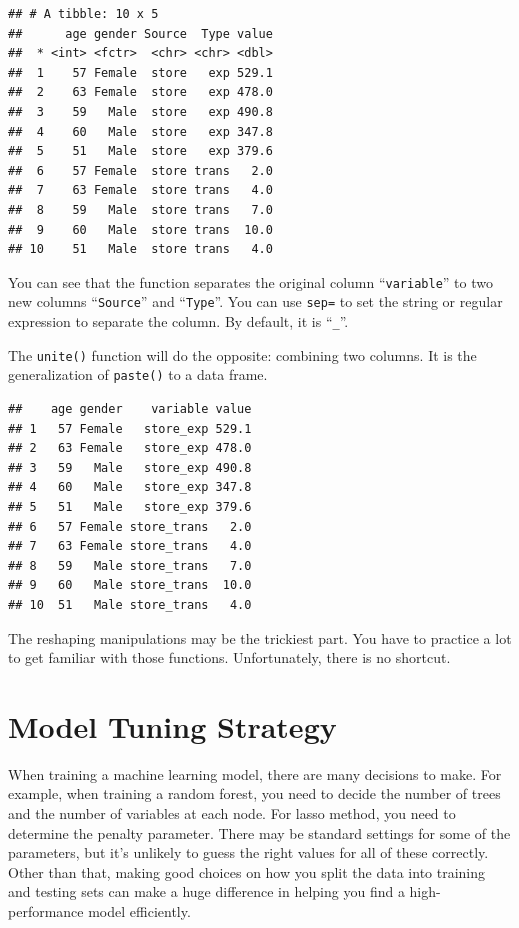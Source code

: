 \documentclass[12pt,]{krantz}
\newenvironment{Shaded}{\begin{snugshade}}{\end{snugshade}}
\newcommand{\KeywordTok}[1]{\textcolor[rgb]{0.13,0.29,0.53}{\textbf{{#1}}}}
\newcommand{\DataTypeTok}[1]{\textcolor[rgb]{0.13,0.29,0.53}{{#1}}}
\newcommand{\StringTok}[1]{\textcolor[rgb]{0.31,0.60,0.02}{{#1}}}
\newcommand{\NormalTok}[1]{{#1}}
\theoremstyle{definition}
\theoremstyle{definition}
\theoremstyle{remark}
\begin{document}
\begin{verbatim}
## # A tibble: 10 x 5
##      age gender Source  Type value
##  * <int> <fctr>  <chr> <chr> <dbl>
##  1    57 Female  store   exp 529.1
##  2    63 Female  store   exp 478.0
##  3    59   Male  store   exp 490.8
##  4    60   Male  store   exp 347.8
##  5    51   Male  store   exp 379.6
##  6    57 Female  store trans   2.0
##  7    63 Female  store trans   4.0
##  8    59   Male  store trans   7.0
##  9    60   Male  store trans  10.0
## 10    51   Male  store trans   4.0
\end{verbatim}

You can see that the function separates the original column
``\texttt{variable}'' to two new columns ``\texttt{Source}'' and
``\texttt{Type}''. You can use \texttt{sep=} to set the string or
regular expression to separate the column. By default, it is
``\texttt{\_}''.

The \texttt{unite()} function will do the opposite: combining two
columns. It is the generalization of \texttt{paste()} to a data frame.

\begin{Shaded}
\end{Shaded}

\begin{verbatim}
##    age gender    variable value
## 1   57 Female   store_exp 529.1
## 2   63 Female   store_exp 478.0
## 3   59   Male   store_exp 490.8
## 4   60   Male   store_exp 347.8
## 5   51   Male   store_exp 379.6
## 6   57 Female store_trans   2.0
## 7   63 Female store_trans   4.0
## 8   59   Male store_trans   7.0
## 9   60   Male store_trans  10.0
## 10  51   Male store_trans   4.0
\end{verbatim}

The reshaping manipulations may be the trickiest part. You have to
practice a lot to get familiar with those functions. Unfortunately,
there is no shortcut.

\chapter{Model Tuning Strategy}\label{model-tuning-strategy}

When training a machine learning model, there are many decisions to
make. For example, when training a random forest, you need to decide the
number of trees and the number of variables at each node. For lasso
method, you need to determine the penalty parameter. There may be
standard settings for some of the parameters, but it's unlikely to guess
the right values for all of these correctly. Other than that, making
good choices on how you split the data into training and testing sets
can make a huge difference in helping you find a high-performance model
efficiently.
\end{document}
